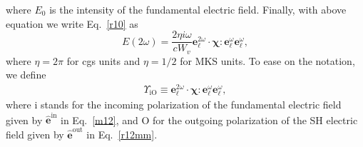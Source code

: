 where $E_{0}$ is the intensity of the fundamental electric field.
Finally, with above equation we write Eq.~\eqref{r10} as
\begin{equation}\label{mr10}
E(2\omega) 
= \frac{2\eta i \omega}{cW_v}
\mathbf{e}^{2\omega}_{\ell}\cdot\boldsymbol{\chi}:\mathbf{e}^{\omega}_{\ell}
\mathbf{e}^{\omega}_{\ell}
,
\end{equation}
where $\eta=2\pi$ for cgs units and $\eta=1/2$ for MKS units.
To ease on the notation, we define
\begin{align}\label{mc0}
\Upsilon_{\mathrm{iO}}
\equiv 
\mathbf{e}^{2\omega}_{\ell}\cdot\boldsymbol{\chi}:\mathbf{e}^{\omega}_{\ell}
\mathbf{e}^{\omega}_{\ell}
,
\end{align}
where i stands for the incoming polarization of the fundamental
electric field given by $\hat{\mathbf{e}}^{\mathrm{in}}$ in Eq.~\eqref{m12},
and O for the outgoing polarization of the SH electric field
given by $\hat{\mathbf{e}}^{\mathrm{out}}$ in Eq.~\eqref{r12mm}.

